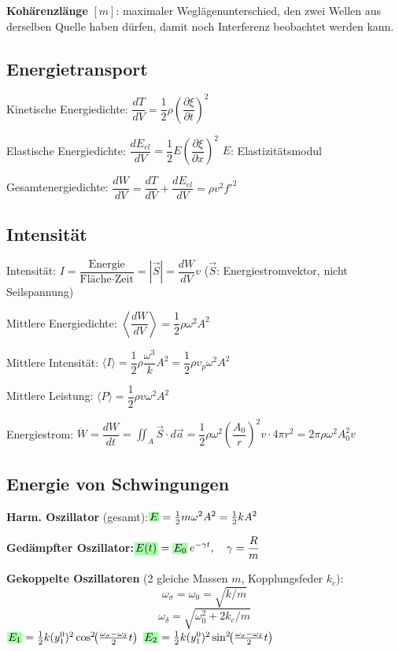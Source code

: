 \documentclass[10pt,a4paper]{article}
\newcommand{\fl}[2]{%
  \noindent #1\hfill$\displaystyle #2$\par\vspace{1pt}}
\newcommand{\ec}[1]{{\setlength\fboxsep{1pt}\colorbox{green!35}{\ensuremath{#1}}}}
\begin{document}
\begin{multicols}{2}
\textbf{Kohärenzlänge} $[m]$: maximaler Weglägenunterschied, den zwei Wellen aus derselben Quelle haben dürfen, damit noch Interferenz beobachtet werden kann.

\subsection{Energietransport}

Kinetische Energiedichte: $\boxed{\dfrac{dT}{dV}=\dfrac{1}{2}\rho\!\left(\dfrac{\partial\xi}{\partial t}\right)^{\!2}}$

Elastische Energiedichte: $\boxed{\dfrac{dE_{el}}{dV}=\dfrac{1}{2}E\!\left(\dfrac{\partial\xi}{\partial x}\right)^{\!2}}$ \quad $E$: Elastizitätsmodul

Gesamtenergiedichte: $\boxed{\dfrac{dW}{dV}=\dfrac{dT}{dV}+\dfrac{dE_{el}}{dV}=\rho v^2 f'^2}$

\subsection{Intensität}

Intensität: $I=\dfrac{\text{Energie}}{\text{Fläche}\cdot\text{Zeit}}=|\vec{S}|=\dfrac{dW}{dV}v$ \quad ($\vec{S}$: Energiestromvektor, nicht Seilspannung)

Mittlere Energiedichte: $\left\langle\dfrac{dW}{dV}\right\rangle=\dfrac{1}{2}\rho\omega^2 A^2$

Mittlere Intensität: $\langle I\rangle=\dfrac{1}{2}\rho\dfrac{\omega^3}{k}A^2=\dfrac{1}{2}\rho v_p\omega^2 A^2$

Mittlere Leistung: $\boxed{\langle P\rangle=\dfrac{1}{2}\rho v\omega^2 A^2}$

Energiestrom:
$\dot{W}=\dfrac{dW}{dt}=\iint_A\vec{S}\cdot d\vec{a}=\dfrac{1}{2}\rho\omega^2\!\left(\dfrac{A_0}{r}\right)^{\!2}v\cdot4\pi r^2=2\pi\rho\omega^2 A_0^2 v$

\subsection{Energie von Schwingungen}

\fl{\textbf{Harm. Oszillator} (gesamt):}{\ec{E}=\tfrac{1}{2}m\omega^2 A^2=\tfrac{1}{2}kA^2}

\fl{\textbf{Gedämpfter Oszillator:}}{\ec{E(t)}=\ec{E_0}\,e^{-\gamma t},\quad \gamma=\dfrac{R}{m}}

\textbf{Gekoppelte Oszillatoren} (2 gleiche Massen $m$, Kopplungsfeder $k_c$):
\[\omega_\sigma=\omega_0=\sqrt{k/m}\]
\[\omega_\delta=\sqrt{\omega_0^2+2k_c/m}\]
$\ec{E_1}=\tfrac{1}{2}k(y_1^0)^2\cos^2\!\!\left(\tfrac{\omega_\sigma-\omega_\delta}{2}t\right)$ \quad
$\ec{E_2}=\tfrac{1}{2}k(y_1^0)^2\sin^2\!\!\left(\tfrac{\omega_\sigma-\omega_\delta}{2}t\right)$


\end{multicols}
\end{document}
